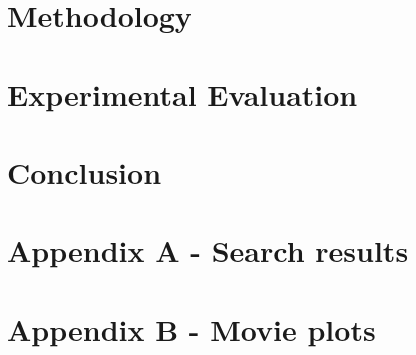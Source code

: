 \documentclass[sigconf]{acmart}
\begin{document}
	
	\section{Methodology}
	\label{sec:method}
	
	
	
	\section{Experimental Evaluation}
	\label{sec:evaluation}
	
	
	
	\section{Conclusion}
	\label {sec:conclusion}
	
	
	
	
	
	
	
	
	


    \newpage
    \section{Appendix A - Search results}
    \label{sec:appendixA}
    

    \newpage
    \section{Appendix B - Movie plots}
    \label{sec:appendixB}
    
\end{document}
